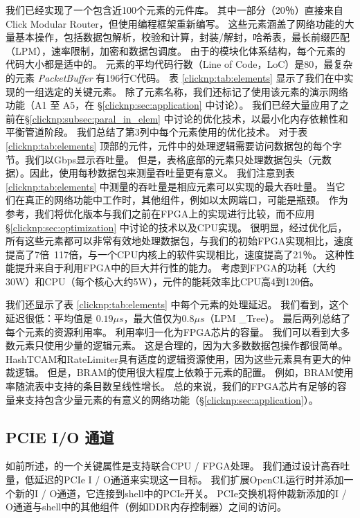 我们已经实现了一个包含近100个元素的\name 元件库。
其中一部分（20％）直接来自Click Modular Router，但使用\name 编程框架重新编写。
这些元素涵盖了网络功能的大量基本操作，包括数据包解析，校验和计算，封装/解封，哈希表，最长前缀匹配（LPM），速率限制，加密和数据包调度。
由于\name 的模块化体系结构，每个元素的代码大小都是适中的。
元素的平均代码行数（Line of Code，LoC）是80，最复杂的元素 \textit {PacketBuffer} 有196行C代码。
表 \ref {clicknp:tab:elements} 显示了我们在\name 中实现的一组选定的关键元素。
除了元素名称，我们还标记了使用该元素的演示网络功能（A1 至 A5，在 \S \ref {clicknp:sec:application} 中讨论）。
我们已经大量应用了之前在\S \ref {clicknp:subsec:paral_in_elem} 中讨论的优化技术，以最小化内存依赖性和平衡管道阶段。
我们总结了第3列中每个元素使用的优化技术。
对于表 \ref {clicknp:tab:elements} 顶部的元件，元件中的处理逻辑需要访问数据包的每个字节。我们以Gbps显示吞吐量。
但是，表格底部的元素只处理数据包头（元数据）。因此，使用每秒数据包来测量吞吐量更有意义。
我们注意到表 \ref {clicknp:tab:elements} 中测量的吞吐量是相应元素可以实现的最大吞吐量。
当它们在真正的网络功能中工作时，其他组件，例如以太网端口，可能是瓶颈。
作为参考，我们将优化版本与我们之前在FPGA上的实现进行比较，而不应用\S \ref {clicknp:sec:optimization} 中讨论的技术以及CPU实现。
很明显，经过优化后，所有这些元素都可以非常有效地处理数据包，与我们的初始FPGA实现相比，速度提高了7倍~117倍，与一个CPU内核上的软件实现相比，速度提高了21％。
这种性能提升来自于利用FPGA中的巨大并行性的能力。
考虑到FPGA的功耗（大约30W）和CPU（每个核心大约5W），\name 元件的能耗效率比CPU高4到120倍。

我们还显示了表 \ref {clicknp:tab:elements} 中每个元素的处理延迟。
我们看到，这个延迟很低：平均值是 $0.19 \mu s$，最大值仅为$0.8 \mu s$（LPM \_Tree）。
最后两列总结了每个元素的资源利用率。 利用率归一化为FPGA芯片的容量。
我们可以看到大多数元素只使用少量的逻辑元素。
这是合理的，因为大多数数据包操作都很简单。
HashTCAM和RateLimiter具有适度的逻辑资源使用，因为这些元素具有更大的仲裁逻辑。
但是，BRAM的使用很大程度上依赖于元素的配置。 例如，BRAM使用率随流表中支持的条目数呈线性增长。
总的来说，我们的FPGA芯片有足够的容量来支持包含少量元素的有意义的网络功能（\S \ref{clicknp:sec:application}）。



\subsection{PCIE I/O 通道}
\label{clicknp:subsec:pcie}

如前所述，\name 的一个关键属性是支持联合CPU / FPGA处理。
我们通过设计高吞吐量，低延迟的PCIe I / O通道来实现这一目标。
我们扩展OpenCL运行时并添加一个新的I / O通道，它连接到shell中的PCIe开关。
PCIe交换机将仲裁新添加的I / O通道与shell中的其他组件（例如DDR内存控制器）之间的访问。

